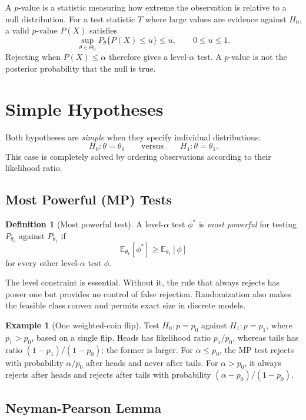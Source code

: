 \documentclass[12pt,oneside]{book}
\numberwithin{equation}{section}
\theoremstyle{definition}
\newtheorem{definition}{Definition}[section]
\newtheorem{example}{Example}[section]
\theoremstyle{plain}
\theoremstyle{remark}
\newcommand{\E}{\mathbb{E}}
\begin{document}
A $p$-value is a statistic measuring how extreme the observation is relative
to a null distribution.  For a test statistic $T$ where large values are
evidence against $H_0$, a valid $p$-value $P(X)$ satisfies
\[
    \sup_{\theta\in\Theta_0}P_\theta\{P(X)\leq u\}\leq u,
    \qquad 0\leq u\leq1.
\]
Rejecting when $P(X)\leq\alpha$ therefore gives a level-$\alpha$ test.  A
$p$-value is not the posterior probability that the null is true.

\section{Simple Hypotheses}

Both hypotheses are \emph{simple} when they specify individual distributions:
\[
    H_0:\theta=\theta_0
    \qquad\text{versus}\qquad
    H_1:\theta=\theta_1.
\]
This case is completely solved by ordering observations according to their
likelihood ratio.

\subsection{Most Powerful (MP) Tests}

\begin{definition}[Most powerful test]
A level-$\alpha$ test $\phi^*$ is \emph{most powerful} for testing
$P_{\theta_0}$ against $P_{\theta_1}$ if
\[
    \E_{\theta_1}[\phi^*]
    \geq \E_{\theta_1}[\phi]
\]
for every other level-$\alpha$ test $\phi$.
\end{definition}

The level constraint is essential.  Without it, the rule that always rejects
has power one but provides no control of false rejection.  Randomization also
makes the feasible class convex and permits exact size in discrete models.

\begin{example}[One weighted-coin flip]
Test $H_0:p=p_0$ against $H_1:p=p_1$, where $p_1>p_0$, based on a single
flip.  Heads has likelihood ratio $p_1/p_0$, whereas tails has ratio
$(1-p_1)/(1-p_0)$; the former is larger.  For $\alpha\leq p_0$, the MP test
rejects with probability $\alpha/p_0$ after heads and never after tails.  For
$\alpha>p_0$, it always rejects after heads and rejects after tails with
probability $(\alpha-p_0)/(1-p_0)$.
\end{example}

\subsection{Neyman-Pearson Lemma}
\end{document}
